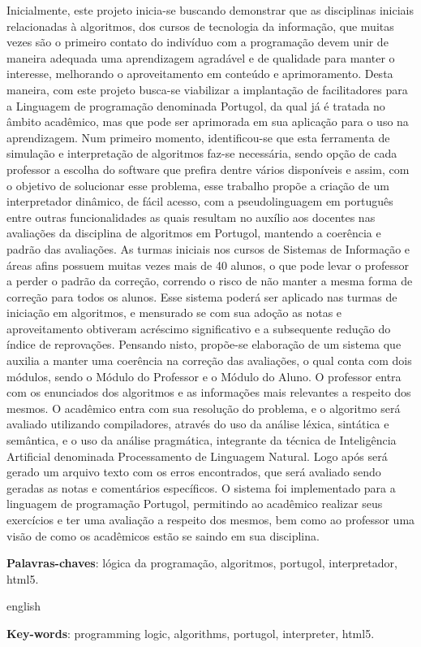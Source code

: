 

\setlength{\absparsep}{18pt} %
\begin{resumo}
Inicialmente, este projeto inicia-se buscando demonstrar que as disciplinas
iniciais relacionadas à algoritmos, dos cursos de tecnologia da informação, que
muitas vezes são o primeiro contato do indivíduo com a programação devem unir de
maneira adequada uma aprendizagem agradável e de qualidade para manter o
interesse, melhorando o aproveitamento em conteúdo e aprimoramento. Desta
maneira, com este projeto busca-se viabilizar a implantação de facilitadores
para a Linguagem de programação denominada Portugol, da qual já é tratada no
âmbito acadêmico, mas que pode ser aprimorada em sua aplicação para o uso na
aprendizagem. Num primeiro momento, identificou-se que esta ferramenta de
simulação e interpretação de algoritmos faz-se necessária, sendo opção de cada
professor a escolha do software que prefira dentre vários disponíveis e assim,
com o objetivo de solucionar esse problema, esse trabalho propõe a criação de
um interpretador dinâmico, de fácil acesso, com a pseudolinguagem em português
entre outras funcionalidades as quais resultam no auxílio aos docentes nas
avaliações da disciplina de algoritmos em Portugol, mantendo a coerência e
padrão das avaliações. As turmas iniciais nos cursos de Sistemas de Informação e
áreas afins possuem muitas vezes mais de 40 alunos, o que pode levar o professor
a perder o padrão da correção, correndo o risco de não manter a mesma forma de
correção para todos os alunos. Esse sistema poderá ser aplicado nas turmas de
iniciação em algoritmos, e mensurado se com sua adoção as notas e aproveitamento
obtiveram acréscimo significativo e a subsequente redução do índice de
reprovações. Pensando nisto, propõe-se elaboração de um sistema que auxilia a
manter uma coerência na correção das avaliações, o qual conta com dois módulos,
sendo o Módulo do Professor e o Módulo do Aluno. O professor entra com os
enunciados dos algoritmos e as informações mais relevantes a respeito dos
mesmos. O acadêmico entra com sua resolução do problema, e o algoritmo será
avaliado utilizando compiladores, através do uso da análise léxica, sintática e
semântica, e o uso da análise pragmática, integrante da técnica de Inteligência
Artificial denominada Processamento de Linguagem Natural. Logo após será gerado
um arquivo texto com os erros encontrados, que será avaliado sendo geradas as
notas e comentários específicos. O sistema foi implementado para a linguagem de
programação Portugol, permitindo ao acadêmico realizar seus exercícios e ter uma
avaliação a respeito dos mesmos, bem como ao professor uma visão de como os
acadêmicos estão se saindo em sua disciplina.

 \textbf{Palavras-chaves}: lógica da programação, algoritmos, portugol, interpretador, html5.
\end{resumo}

\begin{resumo}[Abstract]
 \begin{otherlanguage*}{english}

   \vspace{\onelineskip}

   \noindent
   \textbf{Key-words}: programming logic, algorithms, portugol, interpreter, html5.
 \end{otherlanguage*}
\end{resumo}
